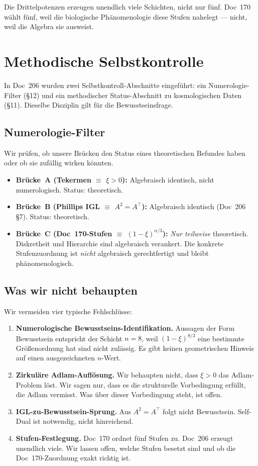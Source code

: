 Die Drittelpotenzen erzeugen unendlich viele Schichten, nicht nur fünf. Doc~170 wählt fünf, weil die biologische Phänomenologie diese Stufen nahelegt — nicht, weil die Algebra sie ausweist.

\section{Methodische Selbstkontrolle}\label{sec:methodik}

In Doc~206 wurden zwei Selbstkontroll-Abschnitte eingeführt: ein Numerologie-Filter (\S12) und ein methodischer Status-Abschnitt zu kosmologischen Daten (\S11). Dieselbe Disziplin gilt für die Bewusstseinsfrage.

\subsection{Numerologie-Filter}

Wir prüfen, ob unsere Brücken den Status eines theoretischen Befundes haben oder ob sie zufällig wirken könnten.

\begin{itemize}
\item \textbf{Brücke~A (Tekermen $\equiv$ $\xi > 0$):} Algebraisch identisch, nicht numerologisch. Status: theoretisch.
\item \textbf{Brücke~B (Phillips IGL $\equiv$ $A^2 = A^\top$):} Algebraisch identisch (Doc~206 \S7). Status: theoretisch.
\item \textbf{Brücke~C (Doc~170-Stufen $\equiv$ $(1-\xi)^{n/3}$):} \emph{Nur teilweise} theoretisch. Diskretheit und Hierarchie sind algebraisch verankert. Die konkrete Stufenzuordnung ist \emph{nicht} algebraisch gerechtfertigt und bleibt phänomenologisch.
\end{itemize}

\subsection{Was wir nicht behaupten}

Wir vermeiden vier typische Fehlschlüsse:

\begin{enumerate}
\item \textbf{Numerologische Bewusstseins-Identifikation.} Aussagen der Form \glqq Bewusstsein entspricht der Schicht $n = 8$, weil $(1-\xi)^{8/3}$ eine bestimmte Größenordnung hat\grqq{} sind nicht zulässig. Es gibt keinen geometrischen Hinweis auf einen ausgezeichneten $n$-Wert.
\item \textbf{Zirkuläre Adlam-Auflösung.} Wir behaupten nicht, dass $\xi > 0$ das Adlam-Problem \glqq löst\grqq{}. Wir sagen nur, dass es die strukturelle Vorbedingung erfüllt, die Adlam vermisst. Was über dieser Vorbedingung steht, ist offen.
\item \textbf{IGL-zu-Bewusstsein-Sprung.} Aus $A^2 = A^\top$ folgt nicht Bewusstsein. Self-Dual ist notwendig, nicht hinreichend.
\item \textbf{Stufen-Festlegung.} Doc~170 ordnet fünf Stufen zu. Doc~206 erzeugt unendlich viele. Wir lassen offen, welche Stufen \glqq besetzt\grqq{} sind und ob die Doc~170-Zuordnung exakt richtig ist.
\end{enumerate}

